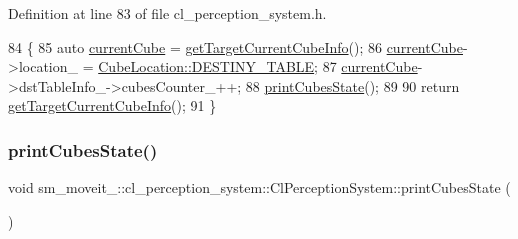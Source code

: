 Definition at line 83 of file cl\+\_\+perception\+\_\+system.\+h.


\begin{DoxyCode}
84             \{
85                 \textcolor{keyword}{auto} \hyperlink{classsm__moveit__4_1_1cl__perception__system_1_1ClPerceptionSystem_ae2a80b803814af8b3c87f810f2728af0}{currentCube} = \hyperlink{classsm__moveit__4_1_1cl__perception__system_1_1ClPerceptionSystem_ac4b944cebb2055a85a33129665df5dcf}{getTargetCurrentCubeInfo}();
86                 \hyperlink{classsm__moveit__4_1_1cl__perception__system_1_1ClPerceptionSystem_ae2a80b803814af8b3c87f810f2728af0}{currentCube}->location\_ = \hyperlink{namespacesm__moveit__4_1_1cl__perception__system_a0d1b8834532a7cf9d19670791eece6d1acdc3fdda18904b4a1ac0be036c86f973}{CubeLocation::DESTINY\_TABLE};
87                 \hyperlink{classsm__moveit__4_1_1cl__perception__system_1_1ClPerceptionSystem_ae2a80b803814af8b3c87f810f2728af0}{currentCube}->dstTableInfo\_->cubesCounter\_++;
88                 \hyperlink{classsm__moveit__4_1_1cl__perception__system_1_1ClPerceptionSystem_a70ec0058531af470ab52268bd6540ddd}{printCubesState}();
89 
90                 \textcolor{keywordflow}{return} \hyperlink{classsm__moveit__4_1_1cl__perception__system_1_1ClPerceptionSystem_ac4b944cebb2055a85a33129665df5dcf}{getTargetCurrentCubeInfo}();
91             \}
\end{DoxyCode}
\mbox{\label{classsm__moveit__4_1_1cl__perception__system_1_1ClPerceptionSystem_a70ec0058531af470ab52268bd6540ddd}} 
\subsubsection{\texorpdfstring{print\+Cubes\+State()}{printCubesState()}}
{\footnotesize\ttfamily void sm\+\_\+moveit\+\_\+::cl\+\_\+perception\+\_\+system\+::\+Cl\+Perception\+System\+::print\+Cubes\+State (\begin{DoxyParamCaption}{ }\end{DoxyParamCaption})\hspace{0.3cm}{\ttfamily [inline]}}




